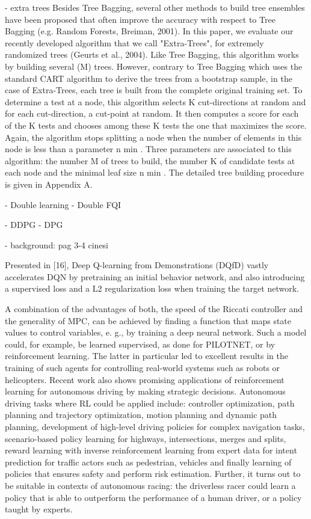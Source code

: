 - extra trees
	Besides Tree Bagging, several other methods to build tree ensembles have been proposed that often improve the accuracy with respect to Tree Bagging (e.g. Random Forests, Breiman, 2001). In this paper, we evaluate our recently developed algorithm that we call "Extra-Trees", for extremely randomized trees (Geurts et al., 2004). Like Tree Bagging, this algorithm works by building several (M) trees. However, contrary to Tree Bagging which uses the standard CART algorithm to derive the trees from a bootstrap sample, in the case of Extra-Trees, each tree is built from the complete original training set. To determine a test at a node, this algorithm selects K cut-directions at random and for each cut-direction, a cut-point at random. It then computes a score for each of the K tests and
chooses among these K tests the one that maximizes the score. Again, the algorithm stops splitting a node when the number of elements in this node is less than a parameter n min . Three parameters are associated to this algorithm: the number M of trees to build, the number K of candidate tests at each node and the minimal leaf size n min . The detailed tree building procedure is given in Appendix A.
	
	- Double learning
	- Double FQI

- DDPG
	- DPG
	



- background:
pag 3-4 cinesi



Presented in [16], Deep Q-learning from Demonstrations
(DQfD) vastly accelerates DQN by pretraining an initial
behavior network, and also introducing a supervised loss and
a L2 regularization loss when training the target network.

A combination of the advantages of both, the speed of the Riccati controller and the generality of MPC, can be achieved by finding a function that maps state values to
control variables, e. g., by training a deep neural network. Such a model could, for example, be learned supervised, as done for PILOTNET, or by reinforcement learning. The latter in particular led to excellent results in the training of such agents for controlling real-world systems such as robots or helicopters.
Recent work also shows promising applications of reinforcement learning for autonomous driving by making strategic decisions. 
Autonomous driving tasks where RL could be applied include: controller optimization, path planning and trajectory optimization, motion planning and dynamic path planning, development of high-level driving policies for complex navigation tasks, scenario-based policy learning for highways, intersections, merges and splits, reward learning with inverse reinforcement learning from expert data for intent prediction for traffic actors such as pedestrian, vehicles and finally learning of policies that ensures safety and perform risk estimation. Further, it turns out to be suitable in contexts of autonomous racing: the driverless racer could learn a policy that is able to outperform the performance of a human driver, or a policy taught by experts.





